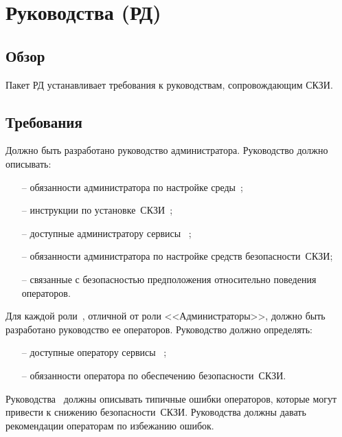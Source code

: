 \section{Руководства (РД)}\label{GD}

\subsection{Обзор}\label{GD.Intro}

Пакет РД устанавливает требования к руководствам, сопровождающим СКЗИ.

\subsection{Требования}\label{GD.Reqs}

\label{R.GD.Admin}
Должно быть разработано руководство администратора.
Руководство должно описывать:
\begin{itemize}
\item[--]
обязанности администратора по настройке 
среды~; 
\item[--]
инструкции по установке~СКЗИ~;
\item[--]
доступные администратору сервисы~ 
;
\item[--]
обязанности администратора по настройке средств безопасности~СКЗИ;
\item[--]
связанные с безопасностью предположения 
относительно поведения операторов.
\end{itemize}

\label{R.GD.Roles}
Для каждой роли~, отличной от роли <<Администраторы>>, 
должно быть разработано руководство ее операторов.
Руководство должно определять:
\begin{itemize}
\item[--]
доступные оператору сервисы~
; 
\item[--]
обязанности оператора по обеспечению безопасности~СКЗИ.
\end{itemize}

\label{R.GD.Misuse}
Руководства~ 
должны описывать типичные ошибки операторов,
которые могут привести к снижению безопасности~СКЗИ.
Руководства должны давать рекомендации операторам по избежанию
ошибок.

